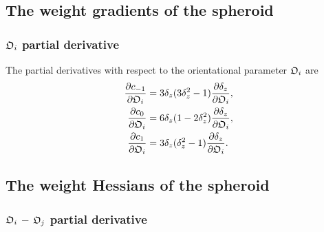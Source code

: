 
\subsection{The weight gradients of the spheroid}


\subsubsection{$\mathfrak{O}_i$ partial derivative}

The partial derivatives with respect to the orientational parameter $\mathfrak{O}_i$ are
\begin{subequations}
\begin{align}
    \frac{\partial c_{-1}}{\partial \mathfrak{O}_i} &= 3\delta_z (3\delta_z^2 - 1) \frac{\partial \delta_z}{\partial \mathfrak{O}_i}, \\
    \frac{\partial c_{0}}{\partial \mathfrak{O}_i}  &= 6\delta_z (1 - 2\delta_z^2) \frac{\partial \delta_z}{\partial \mathfrak{O}_i}, \\
    \frac{\partial c_{1}}{\partial \mathfrak{O}_i}  &= 3\delta_z (\delta_z^2 - 1)  \frac{\partial \delta_z}{\partial \mathfrak{O}_i}.
\end{align}
\end{subequations}




\subsection{The weight Hessians of the spheroid}


\subsubsection{$\mathfrak{O}_i$ -- $\mathfrak{O}_j$ partial derivative}

